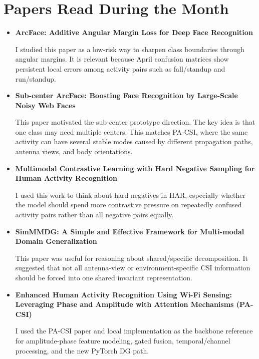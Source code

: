 \documentclass[11pt]{article}
\begin{document}
\section{Papers Read During the Month}

\begin{itemize}[leftmargin=*]
    \item \textbf{ArcFace: Additive Angular Margin Loss for Deep Face Recognition}

    I studied this paper as a low-risk way to sharpen class boundaries through angular margins. It is relevant because April confusion matrices show persistent local errors among activity pairs such as fall/standup and run/standup.

    \item \textbf{Sub-center ArcFace: Boosting Face Recognition by Large-Scale Noisy Web Faces}

    This paper motivated the sub-center prototype direction. The key idea is that one class may need multiple centers. This matches PA-CSI, where the same activity can have several stable modes caused by different propagation paths, antenna views, and body orientations.

    \item \textbf{Multimodal Contrastive Learning with Hard Negative Sampling for Human Activity Recognition}

    I used this work to think about hard negatives in HAR, especially whether the model should spend more contrastive pressure on repeatedly confused activity pairs rather than all negative pairs equally.

    \item \textbf{SimMMDG: A Simple and Effective Framework for Multi-modal Domain Generalization}

    This paper was useful for reasoning about shared/specific decomposition. It suggested that not all antenna-view or environment-specific CSI information should be forced into one shared invariant representation.

    \item \textbf{Enhanced Human Activity Recognition Using Wi-Fi Sensing: Leveraging Phase and Amplitude with Attention Mechanisms (PA-CSI)}

    I used the PA-CSI paper and local implementation as the backbone reference for amplitude-phase feature modeling, gated fusion, temporal/channel processing, and the new PyTorch DG path.
\end{itemize}
\end{document}
